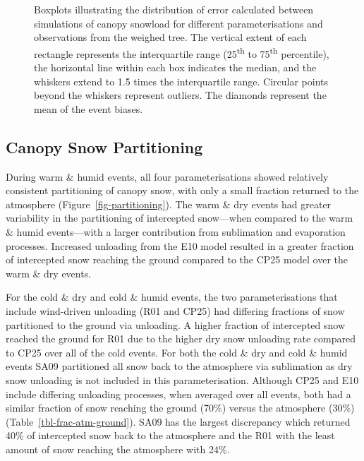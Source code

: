 \documentclass[
]{agujournal2019}
\makeatletter
\newcommand*\pandocbounded[1]{%
  \sbox\pandoc@box{#1}%
  \Gscale@div\@tempa{\textheight}{\dimexpr\ht\pandoc@box+\dp\pandoc@box\relax}%
  \Gscale@div\@tempb{\linewidth}{\wd\pandoc@box}%
  \ifdim\@tempb\p@<\@tempa\p@\let\@tempa\@tempb\fi%
  \ifdim\@tempa\p@<\p@\scalebox{\@tempa}{\usebox\pandoc@box}%
  \else\usebox{\pandoc@box}%
  \fi%
}
\makeatother
\begin{document}
\begin{figure}[htbp]

\centering{

\pandocbounded{\texttt{[image: figs/final/figure10.png]}}

}

\caption{\label{fig-cpy-load-mb-boxplot}Boxplots illustrating the
distribution of error calculated between simulations of canopy snowload
for different parameterisations and observations from the weighed tree.
The vertical extent of each rectangle represents the interquartile range
(25\textsuperscript{th} to 75\textsuperscript{th} percentile), the
horizontal line within each box indicates the median, and the whiskers
extend to 1.5 times the interquartile range. Circular points beyond the
whiskers represent outliers. The diamonds represent the mean of the
event biases.}

\end{figure}%

\subsection{Canopy Snow Partitioning}\label{canopy-snow-partitioning}

During warm \& humid events, all four parameterisations showed
relatively consistent partitioning of canopy snow, with only a small
fraction returned to the atmosphere (Figure~\ref{fig-partitioning}). The
warm \& dry events had greater variability in the partitioning of
intercepted snow---when compared to the warm \& humid events---with a
larger contribution from sublimation and evaporation processes.
Increased unloading from the E10 model resulted in a greater fraction of
intercepted snow reaching the ground compared to the CP25 model over the
warm \& dry events.

For the cold \& dry and cold \& humid events, the two parameterisations
that include wind-driven unloading (R01 and CP25) had differing
fractions of snow partitioned to the ground via unloading. A higher
fraction of intercepted snow reached the ground for R01 due to the
higher dry snow unloading rate compared to CP25 over all of the cold
events. For both the cold \& dry and cold \& humid events SA09
partitioned all snow back to the atmosphere via sublimation as dry snow
unloading is not included in this parameterisation. Although CP25 and
E10 include differing unloading processes, when averaged over all
events, both had a similar fraction of snow reaching the ground (70\%)
versus the atmosphere (30\%) (Table~\ref{tbl-frac-atm-ground}). SA09 has
the largest discrepancy which returned 40\% of intercepted snow back to
the atmosphere and the R01 with the least amount of snow reaching the
atmosphere with 24\%.
\end{document}
